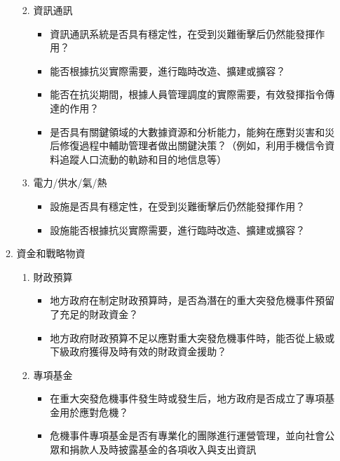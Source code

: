 \documentclass[a4paper,12pt]{article}
\begin{document}
\begin{enumerate}
\begin{enumerate}
\begin{enumerate}
\begin{itemize}
\end{itemize}
\item 資訊通訊
\label{sec:org9daeb4f}
\begin{itemize}
\item 資訊通訊系統是否具有穩定性，在受到災難衝擊后仍然能發揮作用？\\
\item 能否根據抗災實際需要，進行臨時改造、擴建或擴容？\\
\item 能否在抗災期間，根據人員管理調度的實際需要，有效發揮指令傳達的作用？\\
\item 是否具有關鍵領域的大數據資源和分析能力，能夠在應對災害和災后修復過程中輔助管理者做出關鍵決策？（例如，利用手機信令資料追蹤人口流動的軌跡和目的地信息等）\\
\end{itemize}
\item 電力/供水/氣/熱
\label{sec:orgb0442c0}
\begin{itemize}
\item 設施是否具有穩定性，在受到災難衝擊后仍然能發揮作用？\\
\item 設施能否根據抗災實際需要，進行臨時改造、擴建或擴容？\\
\end{itemize}
\end{enumerate}
\item 資金和戰略物資
\label{sec:org9aacbe9}
\begin{enumerate}
\item 財政預算
\label{sec:org3cae2fc}
\begin{itemize}
\item 地方政府在制定財政預算時，是否為潛在的重大突發危機事件預留了充足的財政資金？\\
\item 地方政府財政預算不足以應對重大突發危機事件時，能否從上級或下級政府獲得及時有效的財政資金援助？\\
\end{itemize}
\item 專項基金
\label{sec:orgce3014c}
\begin{itemize}
\item 在重大突發危機事件發生時或發生后，地方政府是否成立了專項基金用於應對危機？\\
\item 危機事件專項基金是否有專業化的團隊進行運營管理，並向社會公眾和捐款人及時披露基金的各項收入與支出資訊\\

\end{itemize}
\end{enumerate}
\end{enumerate}
\end{enumerate}
\end{document}
